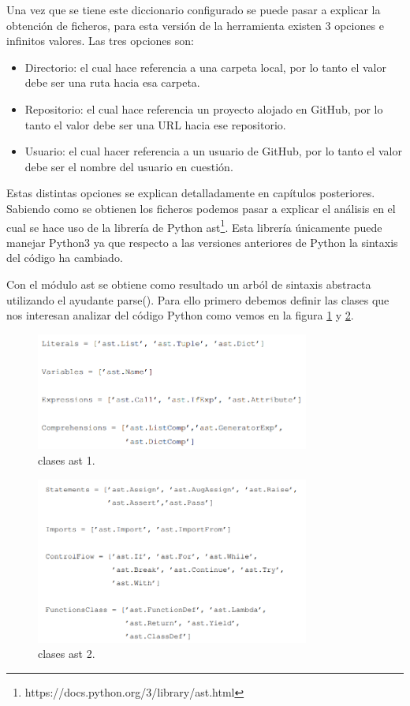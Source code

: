\documentclass[a4paper, 12pt]{book}
\begin{document}
Una vez que se tiene este diccionario configurado se puede pasar a explicar la obtención de ficheros, para esta versión de la herramienta existen 3 opciones e infinitos valores. Las tres opciones son:

\begin{itemize}
	\item Directorio: el cual hace referencia a una carpeta local, por lo tanto el valor debe ser una ruta hacia esa carpeta.
	\item Repositorio: el cual hace referencia un proyecto alojado en GitHub, por lo tanto el valor debe ser una URL hacia ese repositorio.
	\item Usuario: el cual hacer referencia a un usuario de GitHub, por lo tanto el valor debe ser el nombre del usuario en cuestión.
\end{itemize}

Estas distintas opciones se explican detalladamente en capítulos posteriores. Sabiendo como se obtienen los ficheros podemos pasar a explicar el análisis en el cual se hace uso de la librería de Python ast\footnote{https://docs.python.org/3/library/ast.html}. Esta librería únicamente puede manejar Python3 ya que respecto a las versiones anteriores de Python la sintaxis del código ha cambiado.

Con el módulo ast se obtiene como resultado un arból de sintaxis abstracta utilizando el ayudante parse(). Para ello primero debemos definir las clases que nos interesan analizar del código Python como vemos en la figura \ref{fig:ast1} y \ref{fig:ast2}.


\begin{figure}
  \centering
  \includegraphics[width=9cm, keepaspectratio]{img/ast1.png}
  \caption{clases ast 1.}\label{fig:ast1}
\end{figure}

\begin{figure}
  \centering
  \includegraphics[width=9cm, keepaspectratio]{img/ast2.png}
  \caption{clases ast 2.}\label{fig:ast2}
\end{figure}
\end{document}
